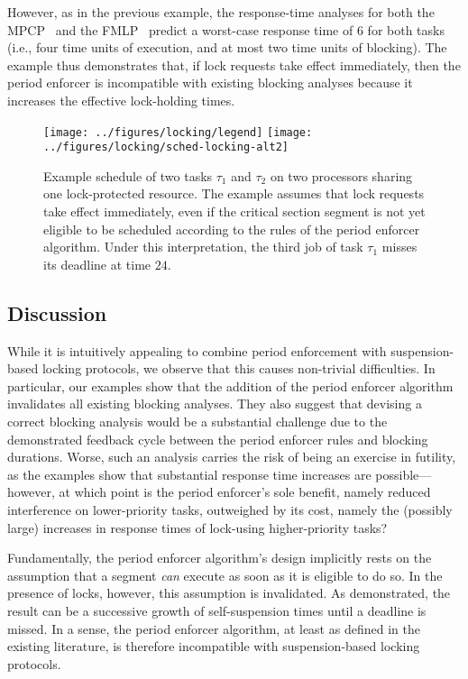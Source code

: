 However, as in the previous example,  the response-time analyses for both the MPCP~\cite{Br:13,LNR:09} and the   FMLP~\cite{Br:13} predict a worst-case response time of $6$ for both tasks (i.e., four time units of execution, and at most two time units of blocking). The example thus demonstrates that, if lock requests take effect immediately, then the period enforcer is incompatible with existing blocking analyses because it increases the effective lock-holding times.


\begin{figure}[t]
  \centering
  \texttt{[image: ../figures/locking/legend]}
  \texttt{[image: ../figures/locking/sched-locking-alt2]}
  \caption{Example schedule of two tasks $\tau_1$ and $\tau_2$ on two processors sharing one lock-protected resource. The example assumes that lock requests take effect immediately, even if the critical section segment is not yet eligible to be scheduled according to the rules of the period enforcer algorithm. Under this interpretation, the third job of task $\tau_1$ misses its deadline at time $24$.}
  \label{fig:locking-alt2}
  \end{figure}


\subsection{Discussion}

While it is intuitively appealing to combine period enforcement with suspension-based locking protocols, we observe that this causes non-trivial difficulties. In particular, our examples show that the addition of the period enforcer algorithm invalidates all existing blocking analyses. They also suggest that devising a correct blocking analysis would be a substantial challenge due to the demonstrated feedback cycle between the period enforcer rules and blocking durations. Worse, such an analysis carries the risk of being an exercise in futility, as the examples show that substantial response time increases are possible---however, at which point is the period enforcer's sole benefit, namely reduced interference on lower-priority tasks, outweighed by its cost, namely the (possibly large) increases in response times of lock-using higher-priority tasks?

Fundamentally, the period enforcer algorithm's design implicitly rests on the assumption that a segment \emph{can} execute as soon as it is eligible to do so. In the presence of locks, however, this assumption is invalidated. As demonstrated, the result can be a successive growth of self-suspension times until a deadline is missed.  In a sense, the period enforcer algorithm, at least as defined in the existing literature, is therefore incompatible with suspension-based locking protocols. 


